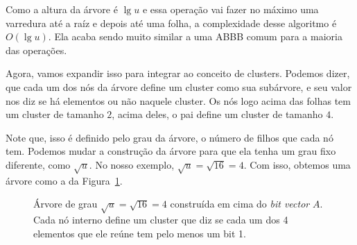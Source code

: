 Como a altura da árvore é $\lg u$ e essa operação vai fazer no máximo uma
varredura até a raíz e depois até uma folha, a complexidade desse algoritmo é
$O(\lg u)$. Ela acaba sendo muito similar a uma ABBB comum para a maioria das
operações.

Agora, vamos expandir isso para integrar ao conceito de clusters. Podemos dizer,
que cada um dos nós da árvore define um cluster como sua subárvore, e seu valor
nos diz se há elementos ou não naquele cluster. Os nós logo acima das folhas tem
um cluster de tamanho $2$, acima deles, o pai define um cluster de tamanho $4$. 

Note que, isso é definido pelo grau da árvore, o número de filhos que cada nó
tem. Podemos mudar a construção da árvore para que ela tenha um grau fixo
diferente, como $\sqrt u$. No nosso exemplo, $\sqrt u = \sqrt{16} = 4$. Com
isso, obtemos uma árvore como a da Figura~\ref{f:veb-clusters}.

\enlargethispage{1\baselineskip}

\begin{figure}[h]
\centering
{}
\caption{Árvore de grau $\sqrt u = \sqrt{16} = 4$ construída em cima do
\textit{bit vector} $A$. Cada nó interno define um cluster que diz se cada um
dos 4 elementos que ele reúne tem pelo menos um bit 1.\label{f:veb-clusters}}
\end{figure}

